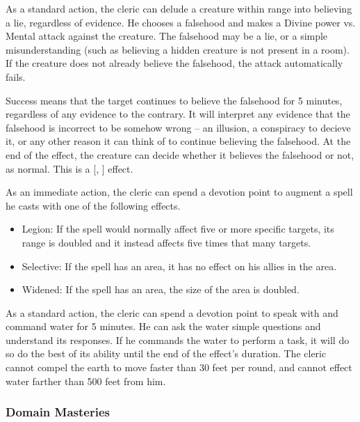             As a standard action, the cleric can delude a creature within \rngmed range into believing a lie, regardless of evidence.
            He chooses a falsehood and makes a Divine power vs. Mental attack against the creature.
            The falsehood may be a lie, or a simple misunderstanding (such as believing a hidden creature is not present in a room).
            If the creature does not already believe the falsehood, the attack automatically fails.

            Success means that the target continues to believe the falsehood for 5 minutes, regardless of any evidence to the contrary.
            It will interpret any evidence that the falsehood is incorrect to be somehow wrong -- an illusion, a conspiracy to decieve it, or any other reason it can think of to continue believing the falsehood.
            At the end of the effect, the creature can decide whether it believes the falsehood or not, as normal.
            This is a [, ] effect.

            As an immediate action, the cleric can spend a devotion point to augment a spell he casts with one of the following effects.
            \begin{itemize}
                \item Legion: If the spell would normally affect five or more specific targets, its range is doubled and it instead affects five times that many targets.
                \item Selective: If the spell has an area, it has no effect on his allies in the area.
                \item Widened: If the spell has an area, the size of the area is doubled.
            \end{itemize}

            As a standard action, the cleric can spend a devotion point to speak with and command water for 5 minutes.
            He can ask the water simple questions and understand its responses.
            If he commands the water to perform a task, it will do so do the best of its ability until the end of the effect's duration.
            The cleric cannot compel the earth to move faster than 30 feet per round, and cannot effect water farther than 500 feet from him.

        \subsubsection{Domain Masteries}\label{Domain Masteries}

